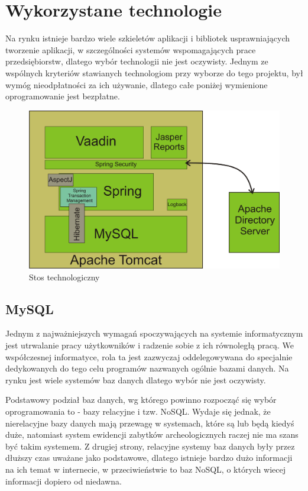 \chapter{Wykorzystane technologie}
Na rynku istnieje bardzo wiele szkieletów aplikacji i bibliotek usprawniających tworzenie aplikacji, w szczególności systemów wspomagających prace przedsiębiorstw, dlatego wybór technologii nie jest oczywisty. Jednym ze wspólnych kryteriów stawianych technologiom przy wyborze do tego projektu, był wymóg nieodpłatności za ich używanie, dlatego całe poniżej wymienione oprogramowanie jest bezpłatne.

\begin{figure} [H]
    \begin{center}
	\includegraphics[scale=1]{img/technologicStack.png}
	\caption{Stos technologiczny}
	\label{architekturaVaadin}
    \end{center}
\end{figure}

\section{MySQL}
Jednym z najważniejszych wymagań spoczywających na systemie informatycznym jest utrwalanie pracy użytkowników i radzenie sobie z ich równoległą pracą. We współczesnej informatyce, rola ta jest zazwyczaj oddelegowywana do specjalnie dedykowanych do tego celu programów nazwanych ogólnie bazami danych. Na rynku jest wiele systemów baz danych dlatego wybór nie jest oczywisty.

\newpage
Podstawowy podział baz danych, wg którego powinno rozpocząć się wybór oprogramowania to - bazy relacyjne i tzw. NoSQL. Wydaje się jednak, że nierelacyjne bazy danych mają przewagę w systemach, które są lub będą kiedyś duże, natomiast system ewidencji zabytków archeologicznych raczej nie ma szans być takim systemem. Z drugiej strony, relacyjne systemy baz danych były przez dłuższy czas uważane jako podstawowe, dlatego istnieje bardzo dużo informacji na ich temat w internecie, w przeciwieństwie to baz NoSQL, o których wiecej informacji dopiero od niedawna.

